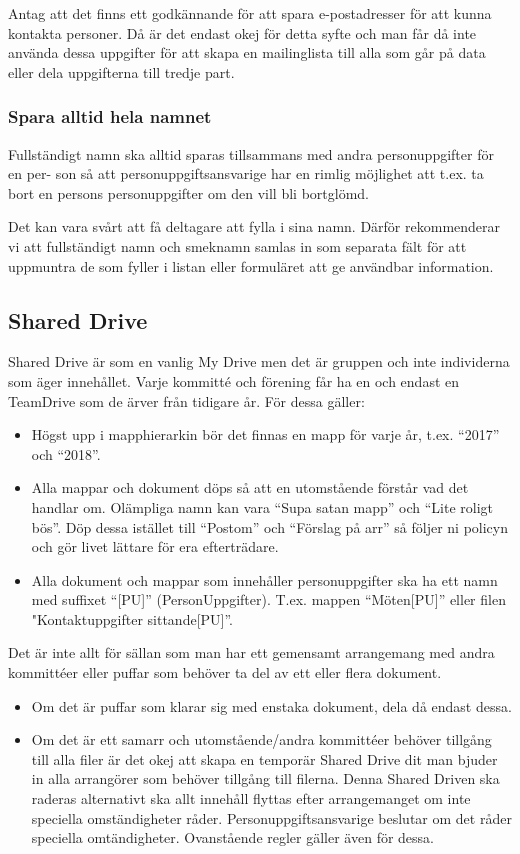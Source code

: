 \documentclass[a4paper]{dtek}
\begin{document}
Antag att det finns ett godkännande för att spara e-postadresser för att kunna kontakta
personer. Då är det endast okej för detta syfte och man får då inte använda dessa uppgifter för att skapa en mailinglista till alla som går på data eller dela uppgifterna till tredje part.

\subsubsection{Spara alltid hela namnet}
Fullständigt namn ska alltid sparas tillsammans med andra personuppgifter för en per-
son så att personuppgiftsansvarige har en rimlig möjlighet att t.ex. ta bort en persons
personuppgifter om den vill bli bortglömd.

Det kan vara svårt att få deltagare att fylla i sina namn. Därför rekommenderar vi att
fullständigt namn och smeknamn samlas in som separata fält för att uppmuntra de som
fyller i listan eller formuläret att ge användbar information.

\subsection{Shared Drive}
Shared Drive är som en vanlig My Drive men det är gruppen och inte individerna som äger
innehållet. Varje kommitté och förening får ha en och endast en TeamDrive som de ärver
från tidigare år. För dessa gäller:
\begin{itemize}
    \item Högst upp i mapphierarkin bör det finnas en mapp för varje år, t.ex. “2017” och “2018”.
    \item Alla mappar och dokument döps så att en utomstående förstår vad det handlar om. Olämpliga namn kan vara “Supa satan mapp” och “Lite roligt bös”. Döp dessa istället till “Postom” och “Förslag på arr” så följer ni policyn och gör livet lättare för era efterträdare.
    \item Alla dokument och mappar som innehåller personuppgifter ska ha ett namn med
suffixet “[PU]” (PersonUppgifter). T.ex. mappen “Möten[PU]” eller filen "Kontaktuppgifter sittande[PU]”.
\end{itemize}

Det är inte allt för sällan som man har ett gemensamt arrangemang med andra kommittéer
eller puffar som behöver ta del av ett eller flera dokument.

\begin{itemize}
    \item Om det är puffar som klarar sig med enstaka dokument, dela då endast dessa.
    \item Om det är ett samarr och utomstående/andra kommittéer behöver tillgång till alla filer är det okej att skapa en temporär Shared Drive dit man bjuder in alla arrangörer som behöver tillgång till filerna. Denna Shared Driven ska raderas alternativt ska allt innehåll flyttas efter arrangemanget om inte speciella omständigheter råder. Personuppgiftsansvarige beslutar om det råder speciella omtändigheter. Ovanstående regler gäller även för dessa.
\end{itemize}
\end{document}
